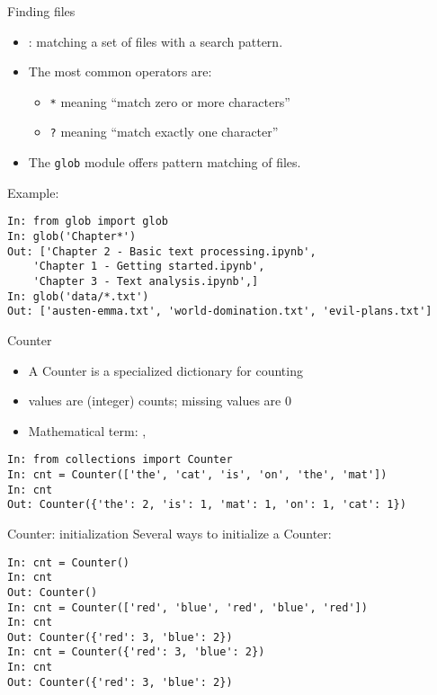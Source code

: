 \documentclass[aspectratio=169,usenames,dvipsnames]{beamer}
\begin{document}
\begin{frame}[fragile]{Finding files}
    \begin{itemize}
        \item {}: matching a set of files with a search pattern.
        \item The most common operators are:
            \begin{itemize}
                \item \texttt{*} meaning ``match zero or more characters''
                \item \texttt{?} meaning ``match exactly one character''
            \end{itemize}
        \item The \texttt{glob} module offers pattern matching of files.
    \end{itemize}
\pause
Example:
\begin{lstlisting}
In: from glob import glob
In: glob('Chapter*')
Out: ['Chapter 2 - Basic text processing.ipynb',
    'Chapter 1 - Getting started.ipynb',
    'Chapter 3 - Text analysis.ipynb',]
In: glob('data/*.txt')
Out: ['austen-emma.txt', 'world-domination.txt', 'evil-plans.txt']
\end{lstlisting}
\end{frame}

\begin{frame}[fragile]{Counter}
\begin{itemize}
\item A Counter is a specialized dictionary for counting
\item values are (integer) counts; missing values are 0
\item Mathematical term: , 
\end{itemize}

\begin{lstlisting}
In: from collections import Counter
In: cnt = Counter(['the', 'cat', 'is', 'on', 'the', 'mat'])
In: cnt
Out: Counter({'the': 2, 'is': 1, 'mat': 1, 'on': 1, 'cat': 1})
\end{lstlisting}
\end{frame}

\begin{frame}[fragile]{Counter: initialization}
Several ways to initialize a Counter:\\

\begin{lstlisting}
In: cnt = Counter()
In: cnt
Out: Counter()
In: cnt = Counter(['red', 'blue', 'red', 'blue', 'red'])
In: cnt
Out: Counter({'red': 3, 'blue': 2})
In: cnt = Counter({'red': 3, 'blue': 2})
In: cnt
Out: Counter({'red': 3, 'blue': 2})
\end{lstlisting}
\end{frame}
\end{document}
